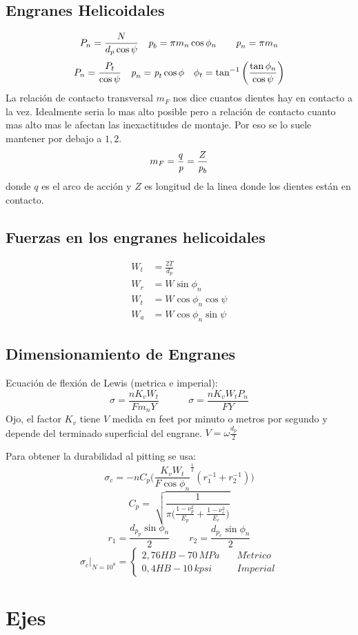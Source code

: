 \documentclass[twocolumn,10pt]{article}
\newcommand{\bigpar}[1]{\bigg(
#1 \bigg) }
\newcommand{\pe}{\textit{\textrm{p}}}
\begin{document}
\subsection{Engranes Helicoidales}
$$P_n=\frac{N}{d_p\cos\psi} \quad \pe_b=\pi m_n \cos \phi_n \qquad \pe_n=\pi m_n$$
$$ P_n=\frac{P_t}{\cos\psi}  \quad \pe_n=\pe_t\cos\phi \quad \phi_t=\tan^{-1} \bigpar{\frac{\tan\phi_n}{\cos \psi}}$$
La relación de contacto transversal $m_F$ nos dice cuantos dientes hay en contacto a la vez. Idealmente seria lo mas alto posible pero a relación de contacto cuanto mas alto mas le afectan las inexactitudes de montaje. Por eso se lo suele mantener por debajo a $1,2$.
$$ m_F=\frac{q}{\pe}=\frac{Z}{\pe_b}$$
donde $q$ es el arco de acción y $Z$ es longitud de la linea donde los dientes están en contacto.\par
\subsection{Fuerzas en los engranes helicoidales}
\begin{align*}
W_t &= \frac{2T}{d_p} \\
W_r &= W\sin \phi_n \\
W_t &= W \cos \phi_n \cos \psi \\
W_a &= W \cos \phi_n \sin \psi 
\end{align*}


\subsection{Dimensionamiento de Engranes}
Ecuación de flexión de Lewis (metrica e imperial):
$$\sigma = \frac{nK_v W_t}{Fm_nY}\qquad \quad \sigma = \frac{nK_v W_t P_n}{FY}$$
Ojo, el factor $K_v$ tiene $V$ medida en feet por minuto o metros por segundo y depende del terminado superficial del engrane. $V=\omega \frac{d_p}{2}$\par
Para obtener la durabilidad al pitting se usa:
$$\sigma_c=-nC_p\bigpar{\frac{K_vW_t}{F\cos \phi_n}^{\frac{1}{2}} (r_1^{-1}+r_2^{-1})} $$
$$C_p=\sqrt[]{ \frac{1}{\pi\bigg(\frac{1-\nu_p^2}{E_p}+\frac{1-\nu_c^2}{E_c} \bigg)} }$$
$$r_1=\frac{d_{p_p}\sin\phi_n}{2}\qquad r_2=\frac{d_{p_c}\sin\phi_n}{2} $$
\[ \sigma_c\big|_{N=10^8} =
  \begin{cases}
    2,76HB-70\, MPa    & \quad M\acute{e}trico \\
    0,4HB-10\, kpsi       & \quad Imperial
  \end{cases}
\]
\section{Ejes}
\end{document}

